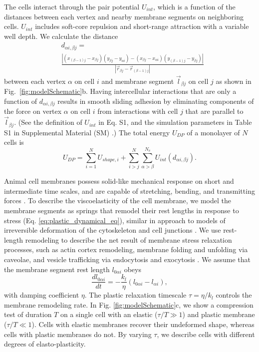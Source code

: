 \documentclass[%
 reprint,
superscriptaddress,
amsmath,amssymb,
prl,
floatfix,
]{revtex4-2}
\begin{document}
The cells interact through the pair potential $U_{int}$, which is a function of the distances between each vertex and nearby membrane segments on neighboring cells. $U_{int}$ includes soft-core repulsion and short-range attraction with a variable well depth. We calculate the distance 
\begin{align}
    \label{eq:point_line_distance}
    &d_{\alpha i,\beta j} = \\ 
    &\frac{|(x_{(\beta-1)j} - x_{\beta j})(y_{\beta j}-y_{\alpha i}) - (x_{\beta j} - x_{\alpha i})(y_{(\beta-1)j} - y_{\beta j})|}{|\vec{r}_{\beta j} - \vec{r}_{(\beta-1)j}|} \nonumber
\end{align}
between each vertex $\alpha$ on cell $i$ and membrane segment $\vec{l}_{\beta j}$ on cell $j$ as shown in Fig.~\ref{fig:modelSchematic}b. Having intercellular interactions that are only a function of $d_{\alpha i,\beta j}$ results in smooth sliding adhesion by eliminating components of the force on vertex $\alpha$ on cell $i$ from interactions with cell $j$ that are parallel to $\vec{l}_{\beta j}$. (See the definition of $U_{int}$ in Eq. S1, and the simulation parameters in Table S1 in Supplemental Material (SM) \cite{supp}.) The total energy $U_{DP}$ of a monolayer of $N$ cells is 
\begin{equation}
    U_{DP} = \sum_{i=1}^N U_{shape,i} + \sum_{i > j}^N \sum_{\alpha > \beta}^{N_v} U_{int}(d_{\alpha i,\beta j}).
\end{equation}

Animal cell membranes possess solid-like mechanical response on short and intermediate time scales, and are capable of stretching, bending, and transmitting forces \cite{dai1997cell, janmey2007cell}. To describe the viscoelasticity of the cell membrane, we model the membrane segments as springs that remodel their rest lengths in response to stress (Eq. \ref{eq:plastic_dynamical_eq}), similar in approach to models of irreversible deformation of the cytoskeleton and cell junctions \cite{munoz2013physiology, staddon2019mechanosensitive, cavanaugh2020rhoa}.  We use rest-length remodeling to describe the net result of membrane stress relaxation processes, such as actin cortex remodeling, membrane folding and unfolding via caveolae, and vesicle trafficking via endocytosis and exocytosis \cite{kelkar2020mechanics, figard2014membrane,cavanaugh2020rhoa}. We assume that the membrane segment rest length $l_{0\alpha i}$ obeys 
\begin{equation}
    \label{eq:plastic_dynamical_eq}
    \frac{dl_{0\alpha i}}{dt} = -\frac{k_l}{\eta}(l_{0\alpha i}-l_{\alpha i}),
\end{equation}
with damping coefficient $\eta$. The plastic relaxation timescale $\tau = \eta / k_l$ controls the membrane remodeling rate. In Fig. \ref{fig:modelSchematic}c, we show a compression test of duration $T$ on a single cell with an elastic ($\tau/T \gg 1$) and plastic membrane ($\tau/T \ll 1$). Cells with elastic membranes recover their undeformed shape, whereas cells with plastic membranes do not. By varying $\tau$, we describe cells with different degrees of elasto-plasticity. 
\end{document}
